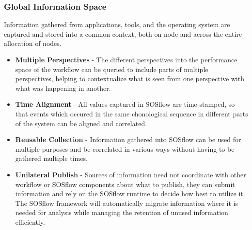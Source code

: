 \subsubsection{Global Information Space}
       Information gathered from applications, tools, and the
       operating system are captured and stored into a common context,
       both on-node and across the entire allocation of nodes.

     \begin{itemize}
        \item \textbf{Multiple Perspectives} - The different
          perspectives into the performance space of the workflow can
          be queried to include parts of multiple
          perspectives, helping to contextualize what is seen from one
          perspective with what was happening in another.
        \item \textbf{Time Alignment} - All values captured in SOSflow
          are time-stamped, so that events which occured in the same
          chonological sequence in different parts of the system can be
          aligned and correlated.
        \item \textbf{Reusable Collection} - Information gathered into
          SOSflow can be used for multiple purposes and be correlated
          in various ways without having to be gathered multiple
          times.
        \item \textbf{Unilateral Publish} - Sources of information
          need not coordinate with other workflow or SOSflow
          components about what to publish, they can submit
          information and rely on the SOSflow runtime to decide
          how best to utilize it.
          The SOSflow framework will automatically migrate
          information where it is needed for analysis while managing
          the retention of unused information efficiently.
     \end{itemize}






